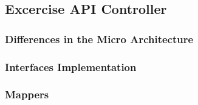 \subsection{Excercise API Controller}
\subsubsection*{Differences in the Micro Architecture}

\subsubsection*{Interfaces Implementation}



\subsubsection*{Mappers}

